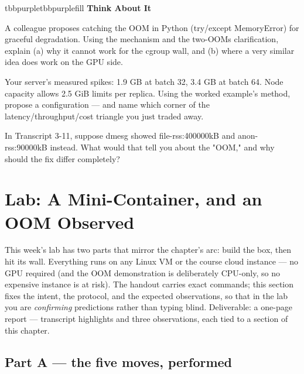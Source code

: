 \begin{calloutbox}{tbbpurple}{tbbpurplefill}
{\normalsize\bfseries\color{tbbpurple}Think About It}\par\vspace{3pt}
\begin{tbbitemize}
  \item A colleague proposes catching the OOM in Python (try/except MemoryError) for graceful degradation. Using the mechanism and the two-OOMs clarification, explain (a) why it cannot work for the cgroup wall, and (b) where a very similar idea does work on the GPU side.
  \item Your server's measured spikes: 1.9 GB at batch 32, 3.4 GB at batch 64. Node capacity allows 2.5 GiB limits per replica. Using the worked example's method, propose a configuration — and name which corner of the latency/throughput/cost triangle you just traded away.
  \item In Transcript 3-11, suppose dmesg showed file-rss:400000kB and anon-rss:90000kB instead. What would that tell you about the "OOM," and why should the fix differ completely?
\end{tbbitemize}
\end{calloutbox}

\section{Lab: A Mini-Container, and an OOM Observed}

This week's lab has two parts that mirror the chapter's arc: build the box, then hit its wall. Everything runs on any Linux VM or the course cloud instance — no GPU required (and the OOM demonstration is deliberately CPU-only, so no expensive instance is at risk). The handout carries exact commands; this section fixes the intent, the protocol, and the expected observations, so that in the lab you are \textit{confirming} predictions rather than typing blind. Deliverable: a one-page report — transcript highlights and three observations, each tied to a section of this chapter.

\subsection*{Part A — the five moves, performed}

